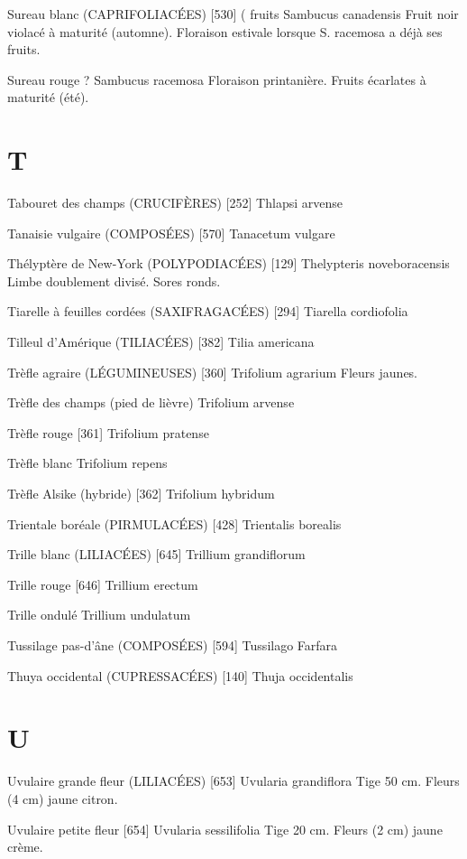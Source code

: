 Sureau blanc (CAPRIFOLIACÉES)  [530]			( fruits
				Sambucus canadensis
Fruit noir violacé à maturité (automne). Floraison estivale lorsque S. racemosa a déjà ses fruits.

Sureau rouge								?
				Sambucus racemosa
Floraison printanière. Fruits écarlates à maturité (été).

\chapter*{T}

Tabouret des champs (CRUCIFÈRES)  [252]
				Thlapsi arvense

Tanaisie vulgaire (COMPOSÉES)  [570]
				Tanacetum vulgare

Thélyptère de New-York (POLYPODIACÉES) [129]
				Thelypteris noveboracensis
Limbe doublement divisé. Sores ronds.

Tiarelle à feuilles cordées (SAXIFRAGACÉES)  [294]
				Tiarella cordiofolia

Tilleul d’Amérique (TILIACÉES)  [382]
				Tilia americana

Trèfle agraire (LÉGUMINEUSES)  [360]
				Trifolium agrarium
Fleurs jaunes.

Trèfle des champs (pied de lièvre)
				Trifolium arvense

Trèfle rouge  [361]
				Trifolium pratense


Trèfle blanc
				Trifolium repens

Trèfle Alsike (hybride)  [362]
				Trifolium hybridum

Trientale boréale (PIRMULACÉES)  [428]
				Trientalis borealis

Trille blanc (LILIACÉES)  [645]
				Trillium grandiflorum

Trille rouge  [646]
				Trillium erectum

Trille ondulé
				Trillium undulatum

Tussilage pas-d’âne (COMPOSÉES)  [594]
				Tussilago Farfara

Thuya occidental (CUPRESSACÉES) [140]
				Thuja occidentalis

\chapter*{U}

Uvulaire grande fleur (LILIACÉES)  [653]
				Uvularia grandiflora
Tige 50 cm. Fleurs (4 cm) jaune citron.

Uvulaire petite fleur  [654]
				Uvularia sessilifolia
Tige 20 cm. Fleurs (2 cm) jaune crème.

